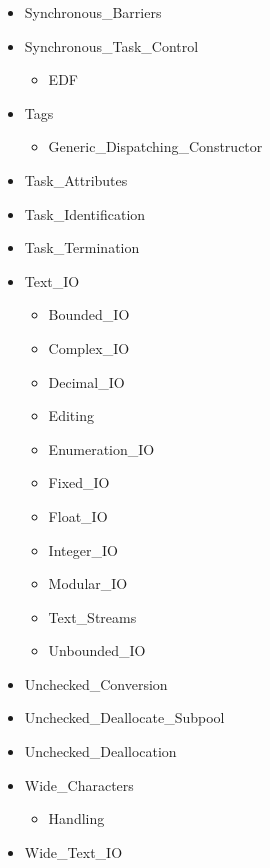 \documentclass[english]{article}
\begin{document}
\begin{scriptsize}
\begin{multicols*}{5}
\begin{itemize}[leftmargin=0mm]
\begin{itemize}[leftmargin=5mm]
\begin{itemize}[leftmargin=5mm]
\begin{itemize}[leftmargin=5mm]
               \end{itemize}
         \end{itemize}
      \item[] Synchronous\_Barriers
      \item[] Synchronous\_Task\_Control
         \begin{itemize}[leftmargin=5mm]
            \item[] EDF
         \end{itemize}
      \item[] Tags
         \begin{itemize}[leftmargin=5mm]
            \item[] Generic\_Dispatching\_Constructor
         \end{itemize}
      \item[] Task\_Attributes
      \item[] Task\_Identification
      \item[] Task\_Termination
      \item[] Text\_IO
         \begin{itemize}[leftmargin=5mm]
            \item[] Bounded\_IO
            \item[] Complex\_IO
            \item[] Decimal\_IO
            \item[] Editing
            \item[] Enumeration\_IO
            \item[] Fixed\_IO
            \item[] Float\_IO
            \item[] Integer\_IO
            \item[] Modular\_IO
            \item[] Text\_Streams
            \item[] Unbounded\_IO
         \end{itemize}
      \item[] Unchecked\_Conversion
      \item[] Unchecked\_Deallocate\_Subpool
      \item[] Unchecked\_Deallocation
      \item[] Wide\_Characters
         \begin{itemize}[leftmargin=5mm]
            \item[] Handling
         \end{itemize}
      \item[] Wide\_Text\_IO

\end{itemize}
\end{itemize}
\end{multicols*}
\end{scriptsize}
\end{document}
